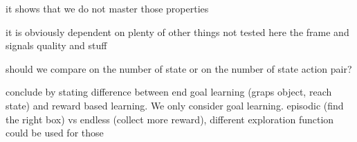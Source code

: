 it shows that we do not master those properties 

it is obviously dependent on plenty of other things not tested here the frame and signals quality and stuff

should we compare on the number of state or on the number of state action pair?

conclude by stating difference between end goal learning (graps object, reach state) and reward based learning. We only consider goal learning. episodic (find the right box) vs endless (collect more reward), different exploration function could be used for those

